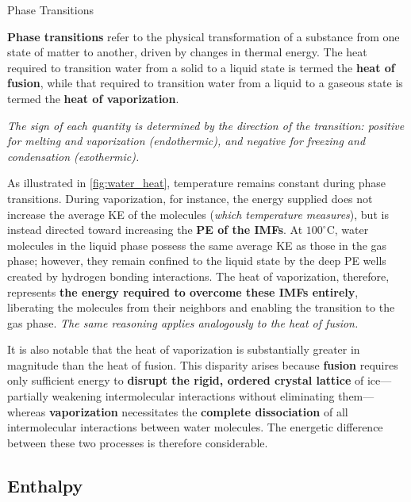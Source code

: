 \documentclass[10pt]{article}
\begin{document}
    \begin{core}{Phase Transitions}

      \textbf{Phase transitions} refer to the physical transformation of a substance from one state of matter to another, driven by changes in thermal energy. The heat required to transition water from a solid to a liquid state is termed the \textbf{heat of fusion}, while that required to transition water from a liquid to a gaseous state is termed the \textbf{heat of vaporization}.

      \textit{The sign of each quantity is determined by the direction of the transition: positive for melting and vaporization (endothermic), and negative for freezing and condensation (exothermic).}

      As illustrated in \autoref{fig:water_heat}, temperature remains constant during phase transitions. During vaporization, for instance, the energy supplied does not increase the average KE of the molecules (\textit{which temperature measures}), but is instead directed toward increasing the \textbf{PE of the IMFs}. At $100^{\circ}$C, water molecules in the liquid phase possess the same average KE as those in the gas phase; however, they remain confined to the liquid state by the deep PE wells created by hydrogen bonding interactions. The heat of vaporization, therefore, represents \textbf{the energy required to overcome these IMFs entirely}, liberating the molecules from their neighbors and enabling the transition to the gas phase. \textit{The same reasoning applies analogously to the heat of fusion.}


      It is also notable that the heat of vaporization is substantially greater in magnitude than the heat of fusion. This disparity arises because \textbf{fusion} requires only sufficient energy to \textbf{disrupt the rigid, ordered crystal lattice} of ice---partially weakening intermolecular interactions without eliminating them---whereas \textbf{vaporization} necessitates the \textbf{complete dissociation} of all intermolecular interactions between water molecules. The energetic difference between these two processes is therefore considerable.

    \end{core}

  \subsection{Enthalpy}
\end{document}
